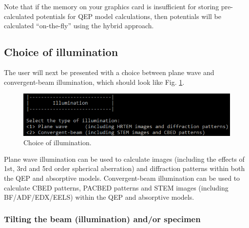 \documentclass[12pt,a4paper]{article}
\begin{document}
Note that if the memory on your graphics card is insufficient for storing pre-calculated potentials for QEP model calculations, then potentials will be calculated ``on-the-fly'' using the hybrid approach.




\subsection{Choice of illumination}

The user will next be presented with a choice between plane wave and convergent-beam illumination, which should look like Fig. \ref{fig:illum_choice}.

\begin{figure}[!h]
\begin{center}
    \includegraphics[scale=0.75]{illumination_choice.png}
\caption{Choice of illumination.}
\label{fig:illum_choice}
\end{center}
\end{figure}

Plane wave illumination can be used to calculate images (including the effects of 1st, 3rd and 5rd order spherical aberration) and diffraction patterns within both the QEP and absorptive models.
Convergent-beam illumination can be used to calculate CBED patterns, PACBED patterns and STEM images (including BF/ADF/EDX/EELS) within the QEP and absorptive models.


\subsubsection{Tilting the beam (illumination) and/or specimen}
\end{document}
